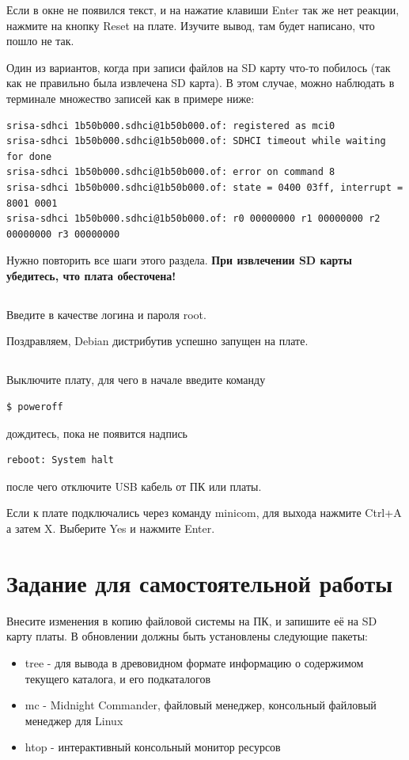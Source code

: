 Если в окне не появился текст, и на нажатие клавиши Enter так же нет реакции,  нажмите на кнопку Reset на плате. Изучите вывод, там будет написано, что пошло не так.

Один из вариантов, когда при записи файлов на SD карту что-то побилось (так как не правильно была извлечена SD карта). В этом случае, можно наблюдать в терминале множество записей как в примере ниже:
\begin{lstlisting}[style=stdout]
srisa-sdhci 1b50b000.sdhci@1b50b000.of: registered as mci0
srisa-sdhci 1b50b000.sdhci@1b50b000.of: SDHCI timeout while waiting for done
srisa-sdhci 1b50b000.sdhci@1b50b000.of: error on command 8
srisa-sdhci 1b50b000.sdhci@1b50b000.of: state = 0400 03ff, interrupt = 8001 0001
srisa-sdhci 1b50b000.sdhci@1b50b000.of: r0 00000000 r1 00000000 r2 00000000 r3 00000000
\end{lstlisting}

Нужно повторить все шаги этого раздела. \textbf{При извлечении SD карты убедитесь, что плата обесточена!}

\subsection{} Введите в качестве логина и пароля root.

Поздравляем, Debian дистрибутив успешно запущен на плате.

\subsection{} Выключите плату, для чего в начале введите команду
\begin{lstlisting}[style=bash]
$ poweroff
\end{lstlisting}
дождитесь, пока не появится надпись
\begin{lstlisting}[style=stdout]
reboot: System halt
\end{lstlisting}
после чего отключите USB кабель от ПК или платы. 

Если к плате подключались через команду minicom, для выхода нажмите Ctrl+A а затем X. Выберите Yes и нажмите Enter.
 
\section{Задание для самостоятельной работы}

Внесите изменения в копию файловой системы на ПК, и запишите её на SD карту платы. В обновлении должны быть установлены следующие пакеты:
\begin{itemize}
	\item tree - для вывода в древовидном формате информацию о содержимом текущего каталога, и его подкаталогов
	
	\item mc - Midnight Commander, файловый менеджер, консольный файловый менеджер для Linux
	
	\item htop - интерактивный консольный монитор ресурсов
\end{itemize}
 
